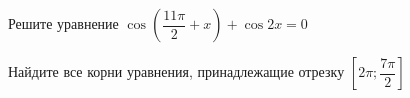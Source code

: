 \begin{ex}
	\begin{condition}
		\begin{enumcols}[label=\asbuk*)]
			\item Решите уравнение \( \cos{\left(\dfrac{11\pi}{2}+x\right)}  + \cos 2x= 0 \)
			\item Найдите все корни уравнения, принадлежащие отрезку \( \left[2\pi;\dfrac{7\pi}{2}\right]  \)
		\end{enumcols}
	\end{condition}
\end{ex}